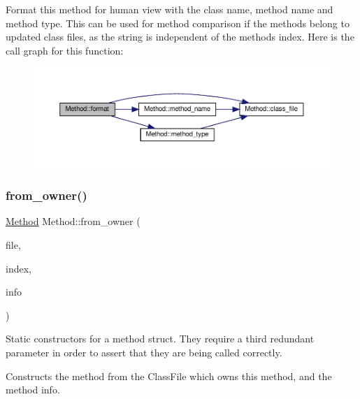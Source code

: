 Format this method for human view with the class name, method name and method type. This can be used for method comparison if the methods belong to updated class files, as the string is independent of the method\textquotesingle{}s index. Here is the call graph for this function\+:
\nopagebreak
\begin{figure}[H]
\begin{center}
\leavevmode
\includegraphics[width=350pt]{classMethod_a3f6d55a368a1e2727bea0799c3cdc0f6_cgraph}
\end{center}
\end{figure}
\mbox{\label{classMethod_ad977afdb14569e1108c6b6849fe0b007}} 
\subsubsection{\texorpdfstring{from\+\_\+owner()}{from\_owner()}}
{\footnotesize\ttfamily \hyperlink{classMethod}{Method} Method\+::from\+\_\+owner (\begin{DoxyParamCaption}\item[{const \hyperlink{classfile_8h_a00b46b60bc40e813e9fb1bb049174346}{Class\+File} \&}]{file,  }\item[{int}]{index,  }\item[{\hyperlink{structmethod__info}{method\+\_\+info}}]{info }\end{DoxyParamCaption})\hspace{0.3cm}{\ttfamily [static]}}

Static constructors for a method struct. They require a third redundant parameter in order to assert that they are being called correctly.

Constructs the method from the Class\+File which owns this method, and the method info.


